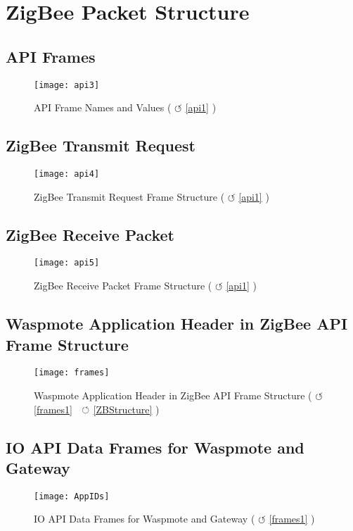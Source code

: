 \clearpage
\section{ZigBee Packet Structure }
\label{AppendixF} %

\subsection{API Frames}
\begin{figure}[htbp]
\centering
\texttt{[image: api3]}
\caption{API Frame Names and Values ( $\circlearrowleft$ \ref{api1} )}
\label{fig:api3 }
\end{figure}
\clearpage
\pagebreak
\subsection{ZigBee Transmit Request}
\begin{figure}[htbp]
\centering
\texttt{[image: api4]}
\caption{ZigBee Transmit Request Frame Structure ( $\circlearrowleft$ \ref{api1} )}
\label{fig:api4}
\end{figure}
\clearpage
\pagebreak
\subsection{ZigBee Receive Packet}
\begin{figure}[htbp]
\centering
\texttt{[image: api5]}
\caption{ZigBee Receive Packet Frame Structure ( $\circlearrowleft$ \ref{api1} )}
\label{fig:api5}
\end{figure}
\clearpage
\pagebreak
\subsection{Waspmote Application Header in ZigBee API Frame Structure}
\begin{figure}[htbp]
\centering
\texttt{[image: frames]}
\caption{Waspmote Application Header in ZigBee API Frame Structure ( $\circlearrowleft$  \ref{frames1}    $ \hspace{0.2cm}\circlearrowleft$ \ref{ZBStructure} )}
\label{fig:frames}
\end{figure}
\clearpage
\pagebreak
\subsection{IO API Data Frames for Waspmote and Gateway}
\label{OwnProtocolLabel}
\begin{figure}[htbp]
\centering
\texttt{[image: AppIDs]}
\caption{IO API Data Frames for Waspmote and Gateway ( $\circlearrowleft$ \ref{frames1} )}
\label{fig:OwnProtocol}
\end{figure}
\clearpage
\pagebreak
